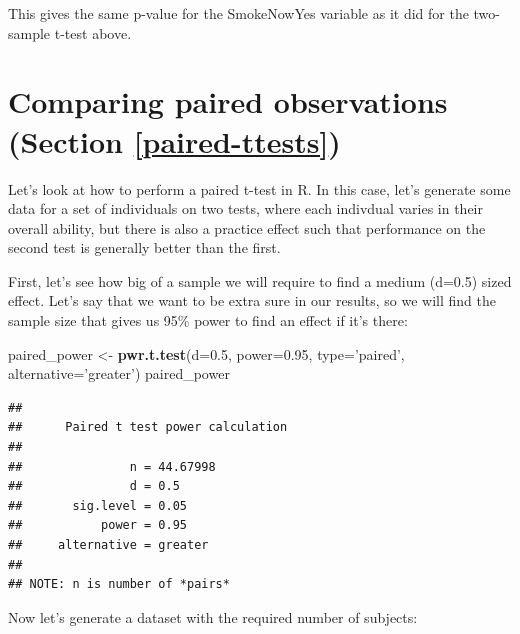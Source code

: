 \documentclass[12pt,]{book}
\newenvironment{Shaded}{\begin{snugshade}}{\end{snugshade}}
\newcommand{\DataTypeTok}[1]{\textcolor[rgb]{0.13,0.29,0.53}{#1}}
\newcommand{\FloatTok}[1]{\textcolor[rgb]{0.00,0.00,0.81}{#1}}
\newcommand{\KeywordTok}[1]{\textcolor[rgb]{0.13,0.29,0.53}{\textbf{#1}}}
\newcommand{\NormalTok}[1]{#1}
\newcommand{\StringTok}[1]{\textcolor[rgb]{0.31,0.60,0.02}{#1}}
\begin{document}
This gives the same p-value for the SmokeNowYes variable as it did for the two-sample t-test above.

\hypertarget{comparing-paired-observations-section-refpaired-ttests}{%
\section{Comparing paired observations (Section \ref{paired-ttests})}\label{comparing-paired-observations-section-refpaired-ttests}}

Let's look at how to perform a paired t-test in R. In this case, let's generate some data for a set of individuals on two tests, where each indivdual varies in their overall ability, but there is also a practice effect such that performance on the second test is generally better than the first.

First, let's see how big of a sample we will require to find a medium (d=0.5) sized effect. Let's say that we want to be extra sure in our results, so we will find the sample size that gives us 95\% power to find an effect if it's there:

\begin{Shaded}
\begin{Highlighting}[]
\NormalTok{paired_power <-}\StringTok{ }\KeywordTok{pwr.t.test}\NormalTok{(}\DataTypeTok{d=}\FloatTok{0.5}\NormalTok{, }\DataTypeTok{power=}\FloatTok{0.95}\NormalTok{, }\DataTypeTok{type=}\StringTok{'paired'}\NormalTok{, }\DataTypeTok{alternative=}\StringTok{'greater'}\NormalTok{)}
\NormalTok{paired_power}
\end{Highlighting}
\end{Shaded}

\begin{verbatim}
## 
##      Paired t test power calculation 
## 
##               n = 44.67998
##               d = 0.5
##       sig.level = 0.05
##           power = 0.95
##     alternative = greater
## 
## NOTE: n is number of *pairs*
\end{verbatim}

Now let's generate a dataset with the required number of subjects:
\end{document}
